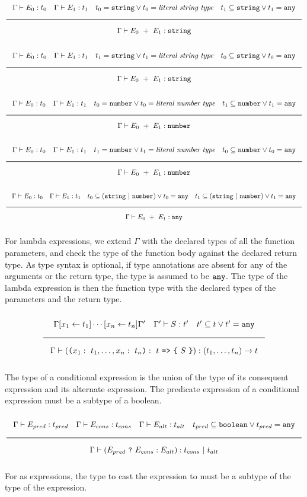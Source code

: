 \noindent
\[
  \Rule{\Gamma \vdash E_0 : t_0 \quad \Gamma \vdash E_1 : t_1 \quad t_0 = \String \vee t_0 = \textit{literal string type}
    \quad t_1 \subseteq \String \vee t_1 = \Any}{\Gamma \vdash E_0\ + \ E_1 : \String}
\]
\noindent
\[
  \Rule{\Gamma \vdash E_0 : t_0 \quad \Gamma \vdash E_1 : t_1 \quad t_1 = \String \vee t_1 = \textit{literal string type}
    \quad t_0 \subseteq \String \vee t_0 = \Any}{\Gamma \vdash E_0\ + \ E_1 : \String}
\]
\noindent
\[
  \Rule{\Gamma \vdash E_0 : t_0 \quad \Gamma \vdash E_1 : t_1 \quad t_0 = \Number \vee t_0 = \textit{literal number type}
    \quad t_1 \subseteq \Number \vee t_1 = \Any}{\Gamma \vdash E_0\ + \ E_1 : \Number}
\]
\noindent
\[
  \Rule{\Gamma \vdash E_0 : t_0 \quad \Gamma \vdash E_1 : t_1 \quad t_1 = \Number \vee t_1 = \textit{literal number type}
    \quad t_0 \subseteq \Number \vee t_0 = \Any}{\Gamma \vdash E_0\ + \ E_1 : \Number}
\]
\noindent
\[
  \Rule{\Gamma \vdash E_0 : t_0 \quad \Gamma \vdash E_1 : t_1 \quad t_0 \subseteq (\String\ |\ \Number) \vee t_0 = \Any
    \quad t_1 \subseteq (\String\ |\ \Number) \vee t_1 = \Any}{\Gamma \vdash E_0\ + \ E_1 : \Any}
\]
\noindent

For lambda expressions, we extend $\Gamma$ with the declared types of all the function parameters,
and check the type of the function body against the declared return type.
As type syntax is optional, if type annotations are absent for any of the arguments or the return type, the type is assumed to be $\texttt{any}$.
The type of the lambda expression is then the function type with the declared types of the parameters and the return type. 

\noindent
\[
  \Rule{\Gamma [x_1 \leftarrow t_1] \cdots [x_n \leftarrow t_n] \Gamma' \quad \Gamma' \vdash S : t' \quad t' \subseteq t \vee t' = \Any}{
    \Gamma \vdash ( \Lp  x_1:\ t_1, \ldots, x_n:\ t_n \Rp :\ t\ \texttt{=>}\ \Lc\ S\ \Rc) : (t_1, \ldots, t_n) \rightarrow t}  
\]
\noindent

The type of a conditional expression is the union of the type of its consequent expression and its alternate expression.
The predicate expression of a conditional expression must be a subtype of a boolean.

\noindent
\[
  \Rule{\Gamma \vdash E_{pred} : t_{pred} \quad \Gamma \vdash E_{cons} : t_{cons} \quad \Gamma \vdash E_{alt} : t_{alt}
    \quad t_{pred} \subseteq \Bool \vee t_{pred} = \Any}{\Gamma \vdash (E_{pred}\ \texttt{?}\ E_{cons} : E_{alt}) : t_{cons}\ |\ t_{alt}}
\]
\noindent

For as expressions, the type to cast the expression to must be a subtype of the type of the expression.

